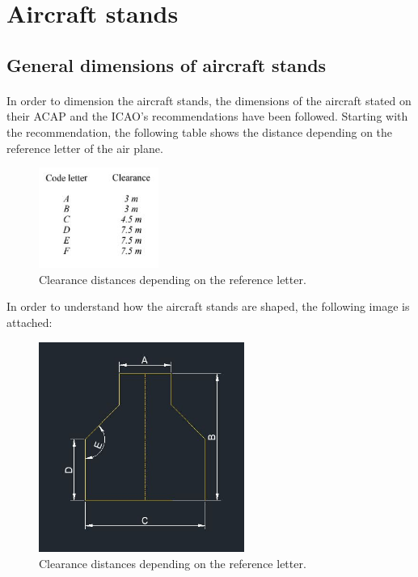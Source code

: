 	\section{Aircraft stands}
		\subsection{General dimensions of aircraft stands}
		\paragraph{}In order to dimension the aircraft stands, the dimensions of the aircraft stated on their ACAP and the ICAO's recommendations have been followed. Starting with the recommendation, the following table shows the distance depending on the reference letter of the air plane. 
		
		\begin{figure}[H]
			\centering
			\includegraphics[clip, trim=0cm 0cm 0cm 0cm, width=0.35\textwidth]{./images/Annex14/clearancedistances}
			\caption{Clearance distances depending on the reference letter.} %
			\label{} %
		\end{figure}
		
		In order to understand how the aircraft stands are shaped, the following image is attached:
		
		\begin{figure}[H]
			\centering
			\includegraphics[clip, trim=0cm 0cm 0cm 0cm, width=0.6\textwidth]{./images/Annex14/aircraftstand}
			\caption{Clearance distances depending on the reference letter.} %
			\label{} %
		\end{figure}
		
